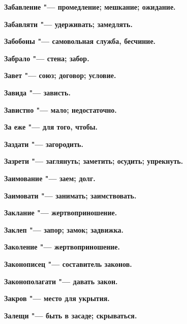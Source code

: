 \bfseries Забавление \normalfont{} "--- промедление; мешкание; ожидание. 




\bfseries Забавляти \normalfont{} "--- удерживать; замедлять. 




\bfseries Забобоны \normalfont{} "--- самовольная служба, бесчиние. 




\bfseries Забрало \normalfont{} "--- стена; забор. 




\bfseries Завет \normalfont{} "--- союз; договор; условие. 




\bfseries Завида \normalfont{} "--- зависть. 




\bfseries Завистно \normalfont{} "--- мало; недостаточно. 




\bfseries За еже \normalfont{} "--- для того, чтобы. 




\bfseries Заздати \normalfont{} "--- загородить. 




\bfseries Зазрети \normalfont{} "--- заглянуть; заметить; осудить; упрекнуть. 




\bfseries Заимование \normalfont{} "--- заем; долг. 




\bfseries Заимовати \normalfont{} "--- занимать; заимствовать. 




\bfseries Заклание \normalfont{} "--- жертвоприношение. 




\bfseries Заклеп \normalfont{} "--- запор; замок; задвижка. 




\bfseries Заколение \normalfont{} "--- жертвоприношение. 




\bfseries Законописец \normalfont{} "--- составитель законов. 




\bfseries Законополагати \normalfont{} "--- давать закон. 




\bfseries Закров \normalfont{} "--- место для укрытия. 




\bfseries Залещи \normalfont{} "--- быть в засаде; скрываться. 




